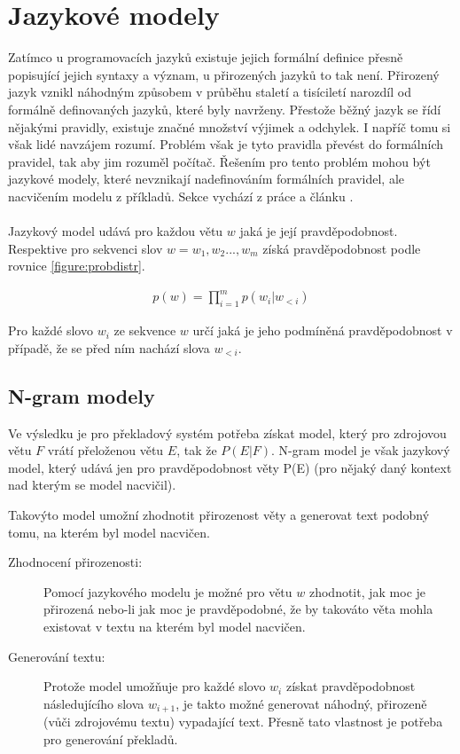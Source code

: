 \section{Jazykové modely}\label{section:langmodel}
Zatímco u programovacích jazyků existuje jejich formální definice přesně popisující jejich syntaxy a význam, u přirozených jazyků to tak není. Přirozený jazyk vznikl náhodným způsobem v průběhu staletí a tisíciletí narozdíl od formálně definovaných jazyků, které byly navrženy. Přestože běžný jazyk se řídí nějakými pravidly, existuje značné množství výjimek a odchylek. I napříč tomu si však lidé navzájem rozumí. Problém však je tyto pravidla převést do formálních pravidel, tak aby jim rozuměl počítač. Řešením pro tento problém mohou být jazykové modely, které nevznikají nadefinováním formálních pravidel, ale nacvičením modelu z příkladů. Sekce vychází z práce \cite{nmtThesis} a článku \cite{nmtTutorial}.
\\\\
Jazykový model udává pro každou větu $w$ jaká je její pravděpodobnost. Respektive pro sekvenci slov $w = w_1, w_2..., w_m$ získá pravděpodobnost podle rovnice \ref{figure:probdistr}.

\begin{align}\label{figure:probdistr}
  p(w) = \prod_{i=1}^{m} p(w_i|w_{<i})
\end{align}

Pro každé slovo $w_i$ ze sekvence $w$ určí jaká je jeho podmíněná pravděpodobnost v případě, že se před ním nachází slova $w_{<i}$.

\subsection{N-gram modely}\label{subsection:ngram}
Ve výsledku je pro překladový systém potřeba získat model, který pro zdrojovou větu $F$ vrátí přeloženou větu $E$, tak že $P(E|F)$. N-gram model je však jazykový model, který udává jen pro pravděpodobnost věty P(E) (pro nějaký daný kontext nad kterým se model nacvičil).

Takovýto model umožní zhodnotit přirozenost věty a generovat text podobný tomu, na kterém byl model nacvičen.

\begin{description}
  \item[Zhodnocení přirozenosti:] Pomocí jazykového modelu je možné pro větu $w$ zhodnotit, jak moc je přirozená nebo-li jak moc je pravděpodobné, že by takováto věta mohla existovat v textu na kterém byl model nacvičen.
  \item[Generování textu:] Protože model umožňuje pro každé slovo $w_i$ získat pravděpodobnost následujícího slova $w_{i+1}$, je takto možné generovat náhodný, přirozeně (vůči zdrojovému textu) vypadající text. Přesně tato vlastnost je potřeba pro generování překladů.
\end{description}

